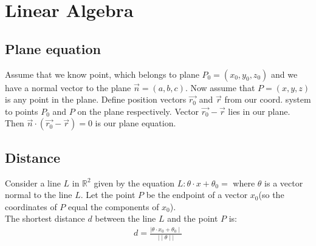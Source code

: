 \section{Linear Algebra}

\subsection{Plane equation}
Assume that we know point, which belongs to plane $P_0=(x_0,y_0,z_0)$ and 
we have a normal vector to the plane $\vec{n}=(a,b,c)$. Now assume that $P=(x,y,z)$
is any point in the plane. Define position vectors $\vec{r_0}$ and $\vec{r}$
from our coord. system to points $P_0$ and $P$ on the plane respectively. Vector $\vec{r_0} - \vec{r}$
lies in our plane. Then $\vec{n} \cdot (\vec{r_0} - \vec{r}) = 0$ is our plane equation.

	

\subsection{Distance}

Consider a line  $L$  in  $\mathbb{R}^2$  given by the equation $L:\theta \cdot x + \theta_0=$ where $\theta$ is a vector normal to the line $L$. Let the point $P$ be the endpoint of a vector $x_0$(so the coordinates of $P$  equal the components of $x_0$).\\

The shortest distance $d$ between the line $L$ and the point $P$ is:
\begin{align*}
d= \displaystyle \frac{\mid \theta \cdot x_0+ \theta _0\mid }{\mid \mid \theta \mid \mid }
\end{align*}